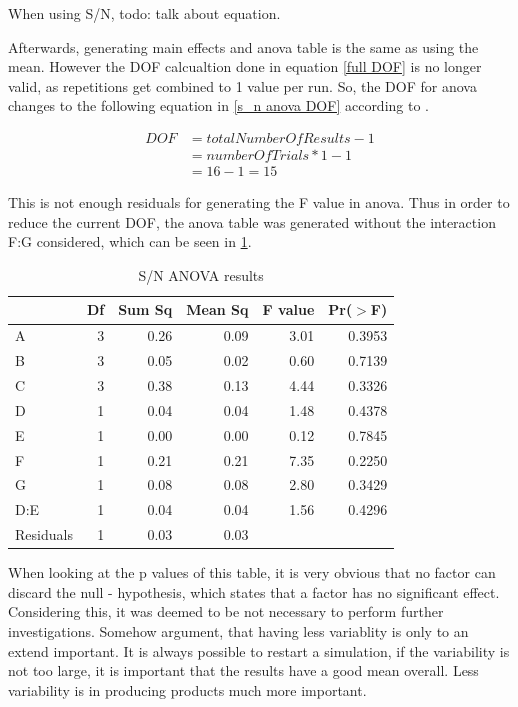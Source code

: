 When using S/N, todo: talk about equation.

Afterwards, generating main effects and anova table is the same as using the mean.
However the DOF calcualtion done in equation \ref{full DOF} is no longer valid, as repetitions get combined to 1 value per run. So, the DOF for anova changes to the following equation in \ref{s_n anova DOF} according to \cite{roy_primer_1990}.

\begin{equation} \label{s_n anova DOF}
	\begin{split}
		DOF & = totalNumberOfResults - 1 \\
		& = numberOfTrials * 1 - 1 \\
		& = 16 - 1 = 15
	\end{split}
\end{equation}


This is not enough residuals for generating the F value in anova. Thus in order to reduce the current DOF, the anova table was generated without the interaction F:G considered, which can be seen in \ref{table:taguchi:s_n_anova_results}.

\begin{table}[ht]
	\centering
	\begin{tabular}{lrrrrr}
		\hline
		& Df & Sum Sq & Mean Sq & F value & Pr($>$F) \\ 
		\hline
		A & 3 & 0.26 & 0.09 & 3.01 & 0.3953 \\ 
		B & 3 & 0.05 & 0.02 & 0.60 & 0.7139 \\ 
		C & 3 & 0.38 & 0.13 & 4.44 & 0.3326 \\ 
		D & 1 & 0.04 & 0.04 & 1.48 & 0.4378 \\ 
		E & 1 & 0.00 & 0.00 & 0.12 & 0.7845 \\ 
		F & 1 & 0.21 & 0.21 & 7.35 & 0.2250 \\ 
		G & 1 & 0.08 & 0.08 & 2.80 & 0.3429 \\ 
		D:E & 1 & 0.04 & 0.04 & 1.56 & 0.4296 \\ 
		Residuals & 1 & 0.03 & 0.03 &  &  \\ 
		\hline
	\end{tabular}
		\caption{S/N ANOVA results}
	\label{table:taguchi:s_n_anova_results}
\end{table}


When looking at the p values of this table, it is very obvious that no factor can discard the null - hypothesis, which states that a factor has no significant effect. Considering this, it was deemed to be not necessary to perform further investigations. 
Somehow argument, that having less variablity is only to an extend important. It is always possible to restart a simulation, if the variability is not too large, it is important that the results have a good mean overall. Less variability is in producing products much more important.

